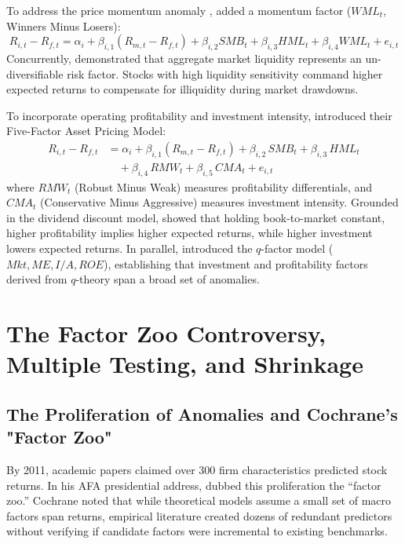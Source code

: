 To address the price momentum anomaly \citep{jegadeesh1993returns}, \citet{carhart1997on} added a momentum factor ($WML_t$, Winners Minus Losers):
\begin{equation}
R_{i,t} - R_{f,t} = \alpha_i + \beta_{i,1} (R_{m,t} - R_{f,t}) + \beta_{i,2} SMB_t + \beta_{i,3} HML_t + \beta_{i,4} WML_t + e_{i,t}
\label{eq:ch2_carhart4}
\end{equation}
Concurrently, \citet{pastor2003liquidity} demonstrated that aggregate market liquidity represents an un-diversifiable risk factor. Stocks with high liquidity sensitivity command higher expected returns to compensate for illiquidity during market drawdowns.

To incorporate operating profitability and investment intensity, \citet{fama2015five} introduced their Five-Factor Asset Pricing Model:
\begin{align}
\label{eq:ch2_ff5_model}
R_{i,t} - R_{f,t} &= \alpha_i + \beta_{i,1} (R_{m,t} - R_{f,t}) + \beta_{i,2}\, SMB_t + \beta_{i,3}\, HML_t \nonumber \\
&\quad + \beta_{i,4}\, RMW_t + \beta_{i,5}\, CMA_t + e_{i,t}
\end{align}
where $RMW_t$ (Robust Minus Weak) measures profitability differentials, and $CMA_t$ (Conservative Minus Aggressive) measures investment intensity. Grounded in the dividend discount model, \citet{fama2015five} showed that holding book-to-market constant, higher profitability implies higher expected returns, while higher investment lowers expected returns. In parallel, \citet{hou2015digesting} introduced the $q$-factor model ($Mkt, ME, I/A, ROE$), establishing that investment and profitability factors derived from $q$-theory span a broad set of anomalies.

\section{The Factor Zoo Controversy, Multiple Testing, and Shrinkage}

\subsection{The Proliferation of Anomalies and Cochrane's "Factor Zoo"}
By 2011, academic papers claimed over 300 firm characteristics predicted stock returns. In his AFA presidential address, \citet{cochrane2011discount} dubbed this proliferation the ``factor zoo.'' Cochrane noted that while theoretical models assume a small set of macro factors span returns, empirical literature created dozens of redundant predictors without verifying if candidate factors were incremental to existing benchmarks.

